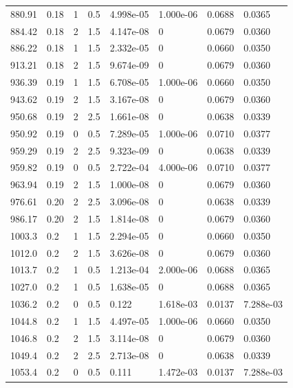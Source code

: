 \documentclass[preview]{standalone}
\begin{document}
{{{\begin{tabular}{L{1.2cm}C{1.2cm} C{0.3cm}C{0.5cm} C{1.4cm}C{1.4cm} C{1.4cm}C{1.4cm}}
  880.91  &  0.18  & 1     & 0.5 &  4.998e-05  & 1.000e-06  & 0.0688 &  0.0365   \\ 
  884.42  &  0.18  & 2     & 1.5 &  4.147e-08  & 0  & 0.0679 &  0.0360   \\ 
  886.22  &  0.18  & 1     & 1.5 &  2.332e-05  & 0  & 0.0660 &  0.0350   \\ 
  913.21  &  0.18  & 2     & 1.5 &  9.674e-09  & 0  & 0.0679 &  0.0360   \\ 
  936.39  &  0.19  & 1     & 1.5 &  6.708e-05  & 1.000e-06  & 0.0660 &  0.0350   \\ 
  943.62  &  0.19  & 2     & 1.5 &  3.167e-08  & 0  & 0.0679 &  0.0360   \\ 
  950.68  &  0.19  & 2     & 2.5 &  1.661e-08  & 0  & 0.0638 &  0.0339   \\ 
  950.92  &  0.19  & 0     & 0.5 &  7.289e-05  & 1.000e-06  & 0.0710 &  0.0377   \\ 
  959.29  &  0.19  & 2     & 2.5 &  9.323e-09  & 0  & 0.0638 &  0.0339   \\ 
  959.82  &  0.19  & 0     & 0.5 &  2.722e-04  & 4.000e-06  & 0.0710 &  0.0377   \\ 
  963.94  &  0.19  & 2     & 1.5 &  1.000e-08  & 0  & 0.0679 &  0.0360   \\ 
  976.61  &  0.20  & 2     & 2.5 &  3.096e-08  & 0  & 0.0638 &  0.0339   \\ 
  986.17  &  0.20  & 2     & 1.5 &  1.814e-08  & 0  & 0.0679 &  0.0360   \\ 
  1003.3  &   0.2  & 1     & 1.5 &  2.294e-05  & 0  & 0.0660 &  0.0350   \\ 
  1012.0  &   0.2  & 2     & 1.5 &  3.626e-08  & 0  & 0.0679 &  0.0360   \\ 
  1013.7  &   0.2  & 1     & 0.5 &  1.213e-04  & 2.000e-06  & 0.0688 &  0.0365   \\ 
  1027.0  &   0.2  & 1     & 0.5 &  1.638e-05  & 0  & 0.0688 &  0.0365   \\ 
  1036.2  &   0.2  & 0     & 0.5 &  0.122  & 1.618e-03  & 0.0137 &  7.288e-03   \\ 
  1044.8  &   0.2  & 1     & 1.5 &  4.497e-05  & 1.000e-06  & 0.0660 &  0.0350   \\ 
  1046.8  &   0.2  & 2     & 1.5 &  3.114e-08  & 0  & 0.0679 &  0.0360   \\ 
  1049.4  &   0.2  & 2     & 2.5 &  2.713e-08  & 0  & 0.0638 &  0.0339   \\ 
  1053.4  &   0.2  & 0     & 0.5 &  0.111  & 1.472e-03  & 0.0137 &  7.288e-03   \\ 

\end{tabular}}}}
\end{document}
